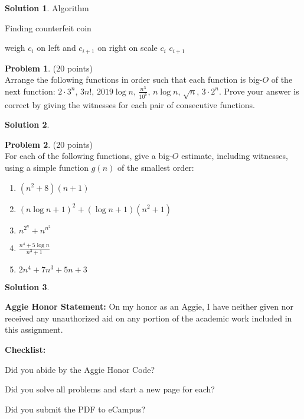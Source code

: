 \documentclass{article}
\theoremstyle{definition}
\newtheorem{problem}{Problem}
\newtheorem{solution}{Solution}
\newcommand{\honor}{\noindent \textbf{Aggie Honor Statement: }On my honor as an Aggie, I have neither
  given nor received any unauthorized aid on any portion of the academic work included in this assignment.
}
\newcommand{\checklist}{\noindent\textbf{Checklist:}
\begin{compactenum}
\item Did you abide by the Aggie Honor Code?
\item Did you solve all problems and start a new page for each? 
\item Did you submit the PDF to eCampus?
\end{compactenum}
}
\begin{document}
\begin{solution}
Algorithm
\begin{algorithm}
\caption{Finding counterfeit coin}
\begin{algorithmic}[1]
		\State weigh $c_i$ on left and $c_{i+1}$ on right on scale
			\State \Return $c_i$
			\State \Return $c_{i+1}$
		\EndIf
	\EndFor
\EndProcedure
\end{algorithmic}
\end{algorithm}
\end{solution}

\newpage

\begin{problem} (20 points)\\
Arrange the following functions in order such that each function is big-$O$ of the next function:  $2\cdot3^n$, $3n!$, $2019\log{n}$, $\displaystyle \frac{n^3}{10^6}$, $n\log{n}$,  $\sqrt{n}$, $3\cdot2^n$.  Prove your answer is correct by giving the witnesses for each pair of consecutive functions.
\end{problem}

\begin{solution}
\end{solution}

\newpage

\begin{problem} (20 points)\\
For each of the following functions, give a big-$O$ estimate, including witnesses, using a simple function $g(n)$ of the smallest order:
\begin{enumerate}
\item $(n^2+8)(n+1)$
\item $(n\log{n} + 1)^2+(\log{n}+1)(n^2+1)$
\item $\displaystyle n^{2^n}+n^{n^2}$
\item $\displaystyle \frac{n^4+5\log{n}}{n^3+1}$
\item $2n^4+7n^3+5n+3$
\end{enumerate}
\end{problem}

\begin{solution}
\end{solution}


\bigskip
\honor

\bigskip
\checklist
\end{document}

